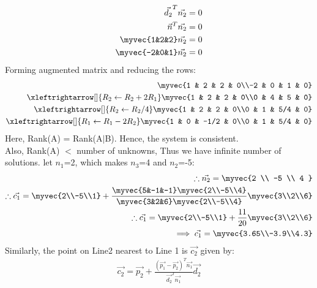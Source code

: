 \documentclass[journal,12pt,twocolumn]{IEEEtran}
\begin{document}
\begin{align}
    \vec{d_2}^T\vec{n_2} =  0\\
    \vec{n}^T\vec{n_2} =  0\\
    \myvec{1&2&2}\vec{n_2}=0\\
    \myvec{-2&0&1}\vec{n_2}=0
\end{align}
Forming augmented matrix and reducing the rows:
\begin{align}
\myvec{1 & 2 & 2 & 0\\-2 & 0 & 1 & 0}\\
\xleftrightarrow[]{R_2\leftarrow R_2+2R_1}
\myvec{1 & 2 & 2 & 0\\0 & 4 & 5 & 0}\\
\xleftrightarrow[]{R_2\leftarrow R_2/4}
\myvec{1 & 2 & 2 & 0\\0 & 1 & 5/4 & 0}\\
\xleftrightarrow[]{R_1\leftarrow R_1-2R_2}
\myvec{1 & 0 & -1/2 & 0\\0 & 1 & 5/4 & 0}
\end{align} 
Here, Rank(A) = Rank(A$\mid$B). Hence, the system is consistent. 
\\
Also, Rank(A) $<$ number of unknowns, Thus we have infinite number of solutions. let $n_1$=2, which makes $n_3$=4 and $n_2$=-5:
\begin{align}
    \therefore \vec{n_2}=\myvec{2 \\ -5 \\ 4 }\\
\therefore \vec{c_1}= \myvec{2\\-5\\1}+\frac{\myvec{5&-1&-1} \myvec{2\\-5\\4}}{\myvec{3&2&6} \myvec{2\\-5\\4}}\myvec{3\\2\\6}\\
\therefore \vec{c_1}= \myvec{2\\-5\\1}+\frac{11}{20}\myvec{3\\2\\6}\\
\implies \vec{c_1}=\myvec{3.65\\-3.9\\4.3}
\end{align}
\newpage \noindent
Similarly, the point on Line2 nearest to Line 1 is $\vec{c_2}$ given by:\\
\begin{align}
\vec{c_2}=\vec{p_2}+\frac{(\vec{p_1}-\vec{p_2})^T \vec{n_1}}{\vec{d_2}^T \vec{n_1}}\vec{d_2} \\
\end{align}
\end{document}
